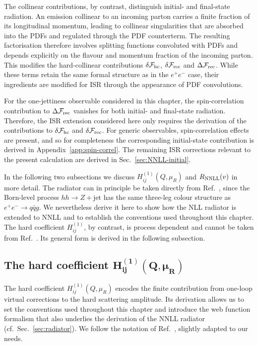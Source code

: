 \begin{itemize}
The collinear contributions, by contrast, distinguish initial- and
final-state radiation. An emission collinear to an incoming parton
carries a finite fraction of its longitudinal momentum, leading to
collinear singularities that are absorbed into the PDFs and regulated 
through the PDF counterterm. The resulting
factorisation therefore involves splitting functions convoluted with
PDFs and depends explicitly on the flavour and momentum fraction of
the incoming parton. This modifies the hard-collinear contributions
$\delta\mathcal{F}_{\rm hc}$, $\delta\mathcal{F}_{\rm rec}$ and
$\Delta\mathcal{F}_{\rm rec}$. While these terms retain the same formal structure as in the
$e^+e^-$ case, their ingredients are modified for ISR through the appearance of PDF convolutions. 

For the one-jettiness observable considered in this chapter, the spin-correlation contribution
to $\Delta\mathcal{F}_{\rm rec}$ vanishes for both initial- and
final-state radiation. Therefore, the ISR extension considered here
only requires the derivation of the contributions to
$\delta\mathcal{F}_{\rm hc}$ and $\delta\mathcal{F}_{\rm rec}$.
For generic observables, spin-correlation effects are present, 
and so for completeness the corresponding initial-state contribution is derived in
Appendix~\ref{app:spin-correl}. The remaining ISR corrections relevant
to the present calculation are derived in Sec.~\ref{sec:NNLL-initial}.
  
  \end{itemize} 
  
In the following two subsections we discuss
$H_{ij}^{(1)}(Q,\mu_R)$ and $R_{\rm NNLL}(v)$ in more detail. The
radiator can in principle be taken directly from
Ref.~\cite{Arpino:2019ozn}, since the Born-level process
$hh\to Z+\text{jet}$ has the same three-leg colour structure as
$e^+e^-\to q\bar q g$. We nevertheless derive it here to show how the
NLL radiator is extended to NNLL and to establish the conventions used
throughout this chapter. The hard coefficient $H_{ij}^{(1)}$, by
contrast, is process dependent and cannot be taken from
Ref.~\cite{Arpino:2019ozn}. Its general form is derived in the
following subsection.
  
\subsection{The hard coefficient $\mathbf{H_{ij}^{(1)}(Q,\mu_R)}$}
\label{sec:H1}

The hard coefficient $H_{ij}^{(1)}(Q,\mu_R)$ encodes the finite contribution
from one-loop virtual corrections to the hard scattering amplitude.
Its derivation allows us to set the conventions used throughout this chapter and introduce
the web function formalism that also underlies the derivation of the NNLL radiator
(cf.\ Sec.~\ref{sec:radiator}). We follow the notation of Ref.~\cite{Catani:1998bh},
 slightly adapted to our needs.
 
